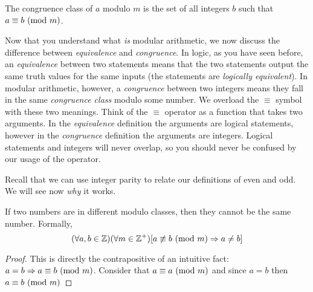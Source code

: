 \documentclass[main.tex]{subfiles}
\begin{document}

\begin{rem}
	The congruence class of \(a\) modulo \(m\) is the set of all integers \(b\) such that \(a \equiv b \ (\mathrm{mod}\ m)\).
\end{rem}

Now that you understand what \textit{is} modular arithmetic, we now discuss the difference between \textit{equivalence} and \textit{congruence}. In logic, as you have seen before, an \textit{equivalence} between two statements means that the two statements output the same truth values for the same inputs (the statements are \textit{logically equivalent}). In modular arithmetic, however, a \textit{congruence} between two integers means they fall in the same \textit{congruence class} modulo some number. We overload the \(\equiv\) symbol with these two meanings. Think of the \(\equiv\) operator as a function that takes two arguments. In the \textit{equivalence} definition the arguments are logical statements, however in the \textit{congruence} definition the arguments are integers. Logical statements and integers will never overlap, so you should never be confused by our usage of the operator.

Recall that we can use integer parity to relate our definitions of even and odd. We will see now \textit{why} it works.

\begin{thm}
	If two numbers are in different modulo classes, then they cannot be the same number. Formally, \[(\forall a,b \in \mathbb{Z})(\forall m \in \mathbb{Z}^+)[a \not\equiv b \ (\mathrm{mod}\ m) \Rightarrow a \neq b]\]
\end{thm}

\begin{proof}
	This is directly the contrapositive of an intuitive fact: \(a = b \Rightarrow a \equiv b \ (\mathrm{mod}\ m)\). Consider that \(a \equiv a \ (\mathrm{mod}\ m)\) and since \(a = b\) then \(a \equiv b \ (\mathrm{mod}\ m)\)
\end{proof}


\end{document}
